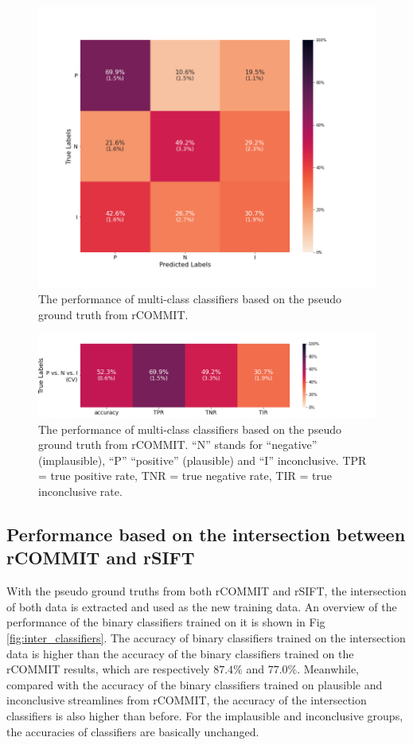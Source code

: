 \begin{figure}[ht]
    \centering
    \includegraphics[width= 12cm]{figures/multi_class.png}
    \caption{The performance of multi-class classifiers based on the pseudo ground truth from rCOMMIT.
    }
\label{fig:rcommit_multi_classifiers}
\end{figure}

\begin{figure}[ht]
    \centering
    \includegraphics[width= 12cm]{figures/multi_class_critiaria.png}
    \caption{The performance of multi-class classifiers based on the pseudo ground truth from rCOMMIT.
    “N” stands for “negative” (implausible), “P” “positive” (plausible) and “I” inconclusive. 
    TPR = true positive rate, TNR = true negative rate, TIR = true inconclusive rate.}
\label{fig:multi_classifiers_critiaria}
\end{figure}


\subsection{Performance based on the intersection between rCOMMIT and rSIFT}
With the pseudo ground truths from both rCOMMIT and rSIFT, the intersection of both data is extracted and used as the new training data.
An overview of the performance of the binary classifiers trained on it is shown in Fig \ref{fig:inter_classifiers}.
The accuracy of binary classifiers trained on the intersection data is higher than the accuracy of the binary classifiers trained on the rCOMMIT results,
which are respectively $87.4\%$ and $77.0\%$. 
Meanwhile, compared with the accuracy of the binary classifiers trained on plausible and inconclusive streamlines from rCOMMIT,
the accuracy of the intersection classifiers is also higher than before.
For the implausible and inconclusive groups, the accuracies of classifiers are basically unchanged. 


